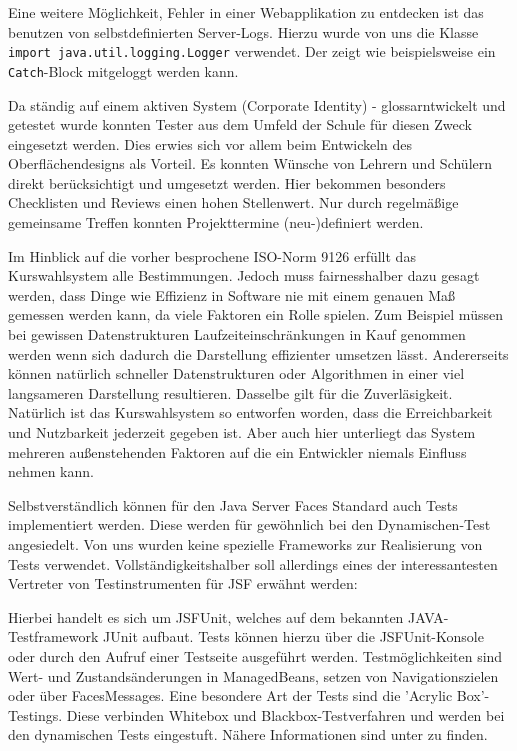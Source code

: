 Eine weitere Möglichkeit, Fehler in einer Webapplikation zu entdecken ist das benutzen von selbstdefinierten Server-Logs.
Hierzu wurde von uns die Klasse \texttt{import java.util.logging.Logger} verwendet. Der  zeigt wie beispielsweise ein \texttt{Catch}-Block  mitgeloggt werden kann.

	

Da ständig auf einem aktiven System (Corporate Identity) - glossarntwickelt und getestet wurde konnten Tester aus dem Umfeld der Schule für diesen Zweck eingesetzt werden.
Dies erwies sich vor allem beim Entwickeln des Oberflächendesigns als Vorteil. Es konnten Wünsche von Lehrern und Schülern direkt berücksichtigt und umgesetzt werden.
Hier bekommen besonders Checklisten und Reviews einen hohen Stellenwert. Nur durch regelmäßige gemeinsame Treffen konnten Projekttermine (neu-)definiert werden.

Im Hinblick auf die vorher besprochene ISO-Norm 9126 erfüllt das Kurswahlsystem alle Bestimmungen. Jedoch muss fairnesshalber dazu gesagt werden, dass Dinge wie Effizienz in Software nie mit einem genauen Maß gemessen werden kann, da viele Faktoren ein Rolle spielen.
Zum Beispiel müssen bei gewissen Datenstrukturen Laufzeiteinschränkungen in Kauf genommen werden wenn sich dadurch die Darstellung effizienter umsetzen lässt. Andererseits können natürlich schneller Datenstrukturen oder Algorithmen in einer viel langsameren Darstellung resultieren.
Dasselbe gilt für die Zuverläsigkeit. Natürlich ist das Kurswahlsystem so entworfen worden, dass die Erreichbarkeit und Nutzbarkeit jederzeit gegeben ist. Aber auch hier unterliegt das System mehreren außenstehenden Faktoren auf die ein Entwickler niemals Einfluss nehmen kann.

Selbstverständlich können für den Java Server Faces Standard auch Tests implementiert werden. Diese werden für gewöhnlich bei den Dynamischen-Test angesiedelt. Von uns wurden keine spezielle Frameworks zur Realisierung von Tests verwendet. Vollständigkeitshalber soll allerdings eines der interessantesten Vertreter von Testinstrumenten für JSF erwähnt werden:

Hierbei handelt es sich um \gls{JSFUnit}, welches auf dem bekannten JAVA-Testframework \gls{JUnit} aufbaut. Tests können hierzu über die JSFUnit-Konsole oder durch den Aufruf einer Testseite ausgeführt werden. Testmöglichkeiten sind Wert- und Zustandsänderungen in ManagedBeans, setzen von Navigationszielen oder über FacesMessages.
Eine besondere Art der Tests sind die 'Acrylic Box'-Testings. Diese verbinden Whitebox und Blackbox-Testverfahren und werden bei den dynamischen Tests eingestuft.
Nähere Informationen sind unter \cite{JSFUnit01} zu finden.

